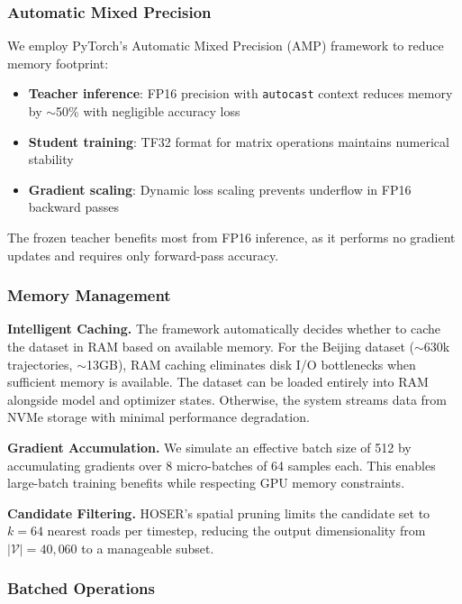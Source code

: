 \subsubsection{Automatic Mixed Precision}

We employ PyTorch's Automatic Mixed Precision (AMP) framework to reduce memory footprint:

\begin{itemize}[noitemsep,topsep=0pt]
\item \textbf{Teacher inference}: FP16 precision with \texttt{autocast} context reduces memory by $\sim$50\% with negligible accuracy loss
\item \textbf{Student training}: TF32 format for matrix operations maintains numerical stability
\item \textbf{Gradient scaling}: Dynamic loss scaling prevents underflow in FP16 backward passes
\end{itemize}

The frozen teacher benefits most from FP16 inference, as it performs no gradient updates and requires only forward-pass accuracy.

\subsubsection{Memory Management}

\textbf{Intelligent Caching.} The framework automatically decides whether to cache the dataset in RAM based on available memory. For the Beijing dataset ($\sim$630k trajectories, $\sim$13GB), RAM caching eliminates disk I/O bottlenecks when sufficient memory is available. The dataset can be loaded entirely into RAM alongside model and optimizer states. Otherwise, the system streams data from NVMe storage with minimal performance degradation.

\textbf{Gradient Accumulation.} We simulate an effective batch size of 512 by accumulating gradients over 8 micro-batches of 64 samples each. This enables large-batch training benefits while respecting GPU memory constraints.

\textbf{Candidate Filtering.} HOSER's spatial pruning limits the candidate set to $k = 64$ nearest roads per timestep, reducing the output dimensionality from $|\mathcal{V}| = 40{,}060$ to a manageable subset.

\subsubsection{Batched Operations}

